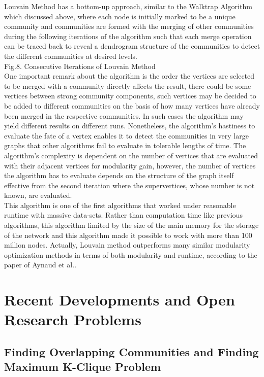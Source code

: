 \documentclass[10pt]{article}
\begin{document}
Louvain Method has a bottom-up approach, similar to the Walktrap Algorithm which discussed above, where each node is initially marked to be a unique community and communities are formed with the merging of other communities during the following iterations of the algorithm such that each merge operation can be traced back to reveal a dendrogram structure of the communities to detect the different communities at desired levels. \\

Fig.8. Consecutive Iterations of Louvain Method\cite{blondel} \\

One important remark about the algorithm is the order the vertices are selected to be merged with a community directly affects the result, there could be some vertices between strong community components, such vertices may be decided to be added to different communities on the basis of how many vertices have already been merged in the respective communities. In such cases the algorithm may yield different results on different runs.
Nonetheless, the algorithm’s hastiness to evaluate the fate of a vertex enables it to detect the communities in very large graphs that other algorithms fail to evaluate in tolerable lengths of time. The algorithm’s complexity is dependent on the number of vertices that are evaluated with their adjacent vertices for modularity gain, however, the number of vertices the algorithm has to evaluate depends on the structure of the graph itself effective from the second iteration where the supervertices, whose number is not known, are evaluated. \\

This algorithm is one of the first algorithms that worked under reasonable runtime with massive data-sets. Rather than computation time like previous algorithms, this algorithm limited by the size of the main memory for the storage of the network and this algorithm made it possible to work with more than 100 million nodes. Actually, Louvain method outperforms many similar modularity optimization methods in terms of both modularity and runtime, according to the paper of Aynaud et al.\cite{french}. \\

\section{Recent Developments and Open Research Problems}

\subsection{Finding Overlapping Communities and Finding Maximum K-Clique Problem}
\end{document}
